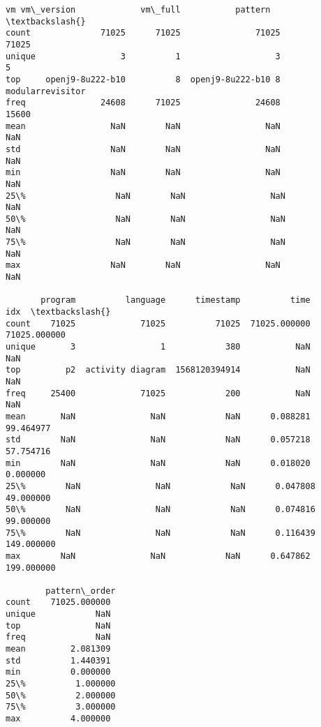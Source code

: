 \documentclass[11pt]{article}
\newcommand{\prompt}[4]{
        \llap{{\color{#2}[#3]: #4}}\vspace{-1.25em}
    }
\begin{document}
            \begin{tcolorbox}[breakable, boxrule=.5pt, size=fbox, pad at break*=1mm, opacityfill=0]
\prompt{Out}{outcolor}{3}{\hspace{3.5pt}}
\begin{Verbatim}[commandchars=\\\{\}]
                      vm vm\_version             vm\_full           pattern  \textbackslash{}
count              71025      71025               71025             71025
unique                 3          1                   3                 5
top     openj9-8u222-b10          8  openj9-8u222-b10 8  modularrevisitor
freq               24608      71025               24608             15600
mean                 NaN        NaN                 NaN               NaN
std                  NaN        NaN                 NaN               NaN
min                  NaN        NaN                 NaN               NaN
25\%                  NaN        NaN                 NaN               NaN
50\%                  NaN        NaN                 NaN               NaN
75\%                  NaN        NaN                 NaN               NaN
max                  NaN        NaN                 NaN               NaN

       program          language      timestamp          time           idx  \textbackslash{}
count    71025             71025          71025  71025.000000  71025.000000
unique       3                 1            380           NaN           NaN
top         p2  activity diagram  1568120394914           NaN           NaN
freq     25400             71025            200           NaN           NaN
mean       NaN               NaN            NaN      0.088281     99.464977
std        NaN               NaN            NaN      0.057218     57.754716
min        NaN               NaN            NaN      0.018020      0.000000
25\%        NaN               NaN            NaN      0.047808     49.000000
50\%        NaN               NaN            NaN      0.074816     99.000000
75\%        NaN               NaN            NaN      0.116439    149.000000
max        NaN               NaN            NaN      0.647862    199.000000

        pattern\_order
count    71025.000000
unique            NaN
top               NaN
freq              NaN
mean         2.081309
std          1.440391
min          0.000000
25\%          1.000000
50\%          2.000000
75\%          3.000000
max          4.000000
\end{Verbatim}
\end{tcolorbox}
        
\end{document}
